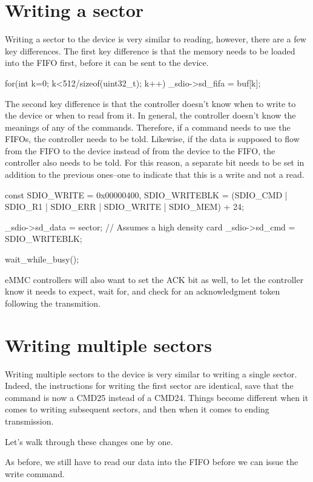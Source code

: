 \documentclass{gqtekspec}
\begin{document}
\section{Writing a sector}
Writing a sector to the device is very similar to reading, however, there
are a few key differences.  The first key difference is that the memory
needs to be loaded into the FIFO first, before it can be sent to the device.
\begin{zCpp}
	for(int k=0; k<512/sizeof(uint32_t); k++)
		_sdio->sd_fifa = buf[k];
\end{zCpp}

The second key difference is that the controller doesn't know when to write
to the device or when to read from it.  In general, the controller doesn't
know the meanings of any of the commands.  Therefore, if a command needs to
use the FIFOs, the controller needs to be told.  Likewise, if the data is
supposed to flow from the FIFO to the device instead of from the device to
the FIFO, the controller also needs to be told.  For this reason, a separate
bit needs to be set in addition to the previous ones--one to indicate that
this is a write and not a read.

\begin{zCpp}
	const	SDIO_WRITE    = 0x00000400,
		SDIO_WRITEBLK = (SDIO_CMD | SDIO_R1 | SDIO_ERR
				| SDIO_WRITE | SDIO_MEM) + 24;

	_sdio->sd_data = sector;	// Assumes a high density card
	_sdio->sd_cmd  = SDIO_WRITEBLK;

	wait_while_busy();
\end{zCpp}

eMMC controllers will also want to set the ACK bit as well, to let the
controller know it needs to expect, wait for, and check for an acknowledgment
token following the transmition.
\section{Writing multiple sectors}
Writing multiple sectors to the device is very similar to writing a single
sector.  Indeed, the instructions for writing the first sector are identical,
save that the command is now a CMD25 instead of a CMD24.  Things become
different when it comes to writing subsequent sectors, and then when it comes
to ending transmission.

Let's walk through these changes one by one.

As before, we still have to read our data into the FIFO before we can issue
the write command.
\end{document}

